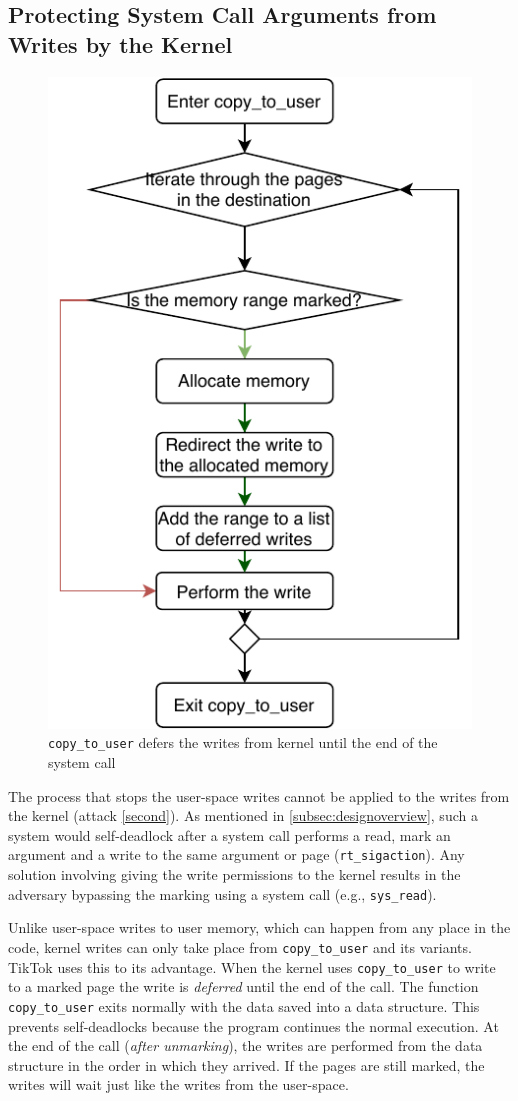 \subsection{Protecting System Call Arguments from Writes by the Kernel}
\label{subsec:kernelland}
\begin{figure}[]
  \centering
  \includegraphics[width = .30 \textwidth]{img/copy_to_user.pdf}
  \caption{\texttt{copy\_to\_user} defers the writes from kernel until the end
  of the system call}
  \label{fig:copytouser}
\end{figure}



The process that stops the user-space writes cannot be applied to the writes
from the kernel (attack \ref{second}). As mentioned in
\cref{subsec:designoverview}, such a system would self-deadlock after a system
call performs a read, mark an argument and a write to the same argument or page
(\texttt{rt\_sigaction}). Any solution involving giving the write permissions to
the kernel results in the adversary bypassing the marking using a system call
(e.g., \texttt{sys\_read}).

Unlike user-space writes to user memory, which can happen from any place in the
code, kernel writes can only take place from \texttt{copy\_to\_user} and its
variants. TikTok uses this to its advantage. When the kernel uses
\texttt{copy\_to\_user} to write to a marked page the write is \emph{deferred}
until the end of the call. The function \texttt{copy\_to\_user} exits normally
with the data saved into a data structure. This prevents self-deadlocks because
the program continues the normal execution. At the end of the call (\emph{after
unmarking}), the writes are performed from the data structure in the order in
which they arrived. If the pages are still marked, the writes will wait just
like the writes from the user-space.

